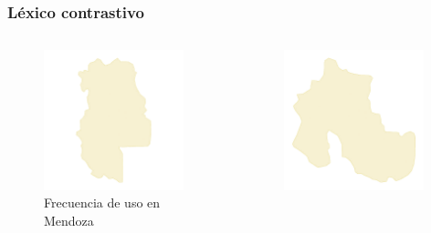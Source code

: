 \begin{frame}[t]\frametitle{Léxico contrastivo}
     
     \begin{columns}[t]  
        \begin{column}{.48\textwidth}
            \begin{figure}
                \includegraphics[width=0.95\textwidth]{../src/images/presentacion/mendoza.png}
                \caption{Frecuencia de uso en {Mendoza}}
                \label{fig:mendoza}
            \end{figure}
        \end{column}
        \begin{column}{.48\textwidth}   
            \begin{figure}
                \includegraphics[width=0.95\textwidth]{../src/images/presentacion/jujuy.png}

\end{figure}
\end{column}
\end{columns}
\end{frame}

